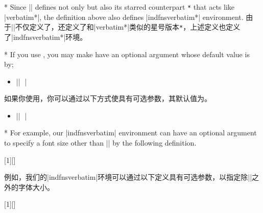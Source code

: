 \begin{paracol}{2}
\switchcolumn[0]*
Since |\newverbatim| defines not only  but also its starred 
counterpart \texttt{*} that acts like |verbatim*|, the
definition above also defines |indfnsverbatim*| environment.
\switchcolumn
由于|\newverbatim|不仅定义了，还定义了和|verbatim*|类似的星号版本\texttt{*}，上述定义也定义了|indfnsverbatim*|环境。

\switchcolumn[0]*
If you use \LaTeXe{}, you may make  have an optional argument
whose default value is  by;

\begin{itemize}\item[]
|\newverbatim|
	|%

\end{itemize}

\switchcolumn
如果你使用\LaTeXe{}，你可以通过以下方式使具有可选参数，其默认值为。
\begin{itemize}\item[]
    |\newverbatim|
        |%
    
    \end{itemize}

\switchcolumn[0]*
For example, our |indfnsverbatim| environment can have an optional
argument to specify a font size other than |\footnotesize| by the
following definition.

\begin{iverbatim}
[1][\footnotesize]%
       {\begin{itemize}\item[]#1}{}{}{\end{itemize}}
\end{iverbatim}
\switchcolumn
例如，我们的|indfnsverbatim|环境可以通过以下定义具有可选参数，以指定除|\footnotesize|之外的字体大小。
\begin{iverbatim}
    [1][\footnotesize]%
           {\begin{itemize}\item[]#1}{}{}{\end{itemize}}
    \end{iverbatim}


\end{paracol}
